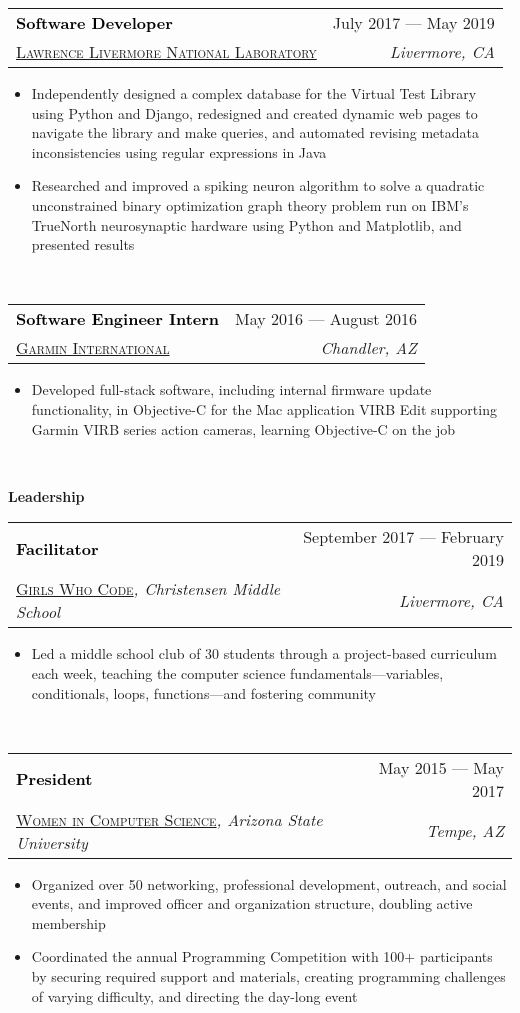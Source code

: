 \documentclass[letterpaper,11pt]{article}
\makeatletter
\newcommand{\resumeSpacing}{5pt}
\newcommand{\resumeSection}[1]{
  \begin{flushleft}
  {\LARGE
  \textcolor{accent}{\textbf{#1}}
  \hrulefill}
  \end{flushleft}
}
\newcommand{\resumeSubsection}[6]{
  \begin{center}
  \vspace{-2.5pt}
	\begin{tabular*}{\textwidth}{l@{\extracolsep{\fill}}r}
	\large\textcolor{black}{\textbf{#1}} & \small\textcolor{accent}{#2} \\
  \href{#4}{\textsc{#3}}\textit{#6} & \textit{#5} \\
	\end{tabular*}
  \vspace{-\resumeSpacing}
  \end{center}
}
\newenvironment{resumeItemize}{
  \addtolength{\leftmargini}{-\resumeSpacing}
  \begin{minipage}{0.99\textwidth}
  \begin{itemize}
  \small
}{
  \end{itemize}
  \vspace{0pt}
  \end{minipage}
  \normalsize
  \ \\
}
\newcommand{\resumeItem}[1]
{
  \item{#1}
  \vspace{-\resumeSpacing}
}
\makeatother
\begin{document}
  \resumeSubsection
  {Software Developer}{July 2017 --- May 2019}
  {Lawrence Livermore National Laboratory}{https://www.llnl.gov/}{Livermore, CA}{}
  \begin{resumeItemize}
	  \resumeItem
    {Independently designed a complex database for the Virtual Test Library using Python and Django, redesigned and created dynamic web pages to navigate the library and make queries, and automated revising metadata inconsistencies using regular expressions in Java}
	  \resumeItem
	  {Researched and improved a spiking neuron algorithm to solve a quadratic unconstrained binary optimization graph theory problem run on IBM's TrueNorth neurosynaptic hardware using Python and Matplotlib, and presented results}
  \end{resumeItemize}
	\resumeSubsection
  {Software Engineer Intern}{May 2016 --- August 2016}
  {Garmin International}{https://www.garmin.com/}{Chandler, AZ}{}
	\begin{resumeItemize}
	\resumeItem
	{Developed full-stack software, including internal firmware update functionality, in Objective-C for the Mac application VIRB Edit supporting Garmin VIRB series action cameras, learning Objective-C on the job}
	\end{resumeItemize}
  \resumeSection{Leadership}
  \resumeSubsection
  {Facilitator}{September 2017 --- February 2019}
  {Girls Who Code}{https://girlswhocode.com/}{Livermore, CA}{, Christensen Middle School}
  \begin{resumeItemize}
  \resumeItem
    {Led a middle school club of 30 students through a project-based curriculum each week, teaching the computer science fundamentals---variables, conditionals, loops, functions---and fostering community}
  \end{resumeItemize}
  \resumeSubsection
  {President}{May 2015 --- May 2017}
  {Women in Computer Science}{http://wics-asu.org/}{Tempe, AZ}{, Arizona State University}
  \begin{resumeItemize}
	  \resumeItem
    {Organized over 50 networking, professional development, outreach, and social events, and improved officer and organization structure, doubling active membership}
	  \resumeItem
    {Coordinated the annual Programming Competition with 100+ participants by securing required support and materials, creating programming challenges of varying difficulty, and directing the day-long event}
  \end{resumeItemize}
\end{document}
